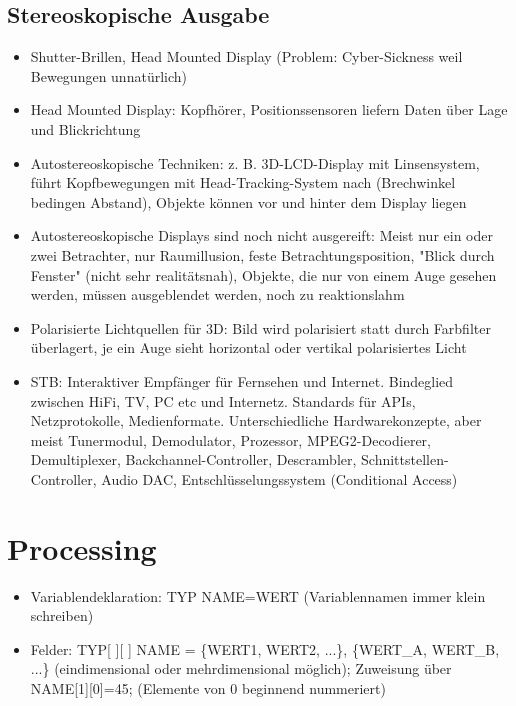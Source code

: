 \documentclass[12pt,landscape]{article}
\begin{document}
\begin{multicols}{3}
\subsection{Stereoskopische Ausgabe}
\begin{itemize}
\item Shutter-Brillen, Head Mounted Display (Problem: Cyber-Sickness weil Bewegungen unnatürlich)
\item Head Mounted Display: Kopfhörer, Positionssensoren liefern Daten über Lage und Blickrichtung
\item Autostereoskopische Techniken: z. B. 3D-LCD-Display mit Linsensystem, führt Kopfbewegungen mit Head-Tracking-System nach (Brechwinkel bedingen Abstand), Objekte können vor und hinter dem Display liegen
\item Autostereoskopische Displays sind noch nicht ausgereift: Meist nur ein oder zwei Betrachter, nur Raumillusion, feste Betrachtungsposition, "Blick durch Fenster" (nicht sehr realitätsnah), Objekte, die nur von einem Auge gesehen werden, müssen ausgeblendet werden, noch zu reaktionslahm
\item Polarisierte Lichtquellen für 3D: Bild wird polarisiert statt durch Farbfilter überlagert, je ein Auge sieht horizontal oder vertikal polarisiertes Licht
\item STB: Interaktiver Empfänger für Fernsehen und Internet. Bindeglied zwischen HiFi, TV, PC etc und Internetz. Standards für APIs, Netzprotokolle, Medienformate. Unterschiedliche Hardwarekonzepte, aber meist Tunermodul, Demodulator, Prozessor, MPEG2-Decodierer, Demultiplexer, Backchannel-Controller, Descrambler, Schnittstellen-Controller, Audio DAC, Entschlüsselungssystem (Conditional Access)
\end{itemize}


\section{Processing}
\begin{itemize}
\item Variablendeklaration: TYP NAME=WERT (Variablennamen immer klein schreiben)
\item Felder: TYP[ ][ ] NAME = \{WERT1, WERT2, ...\}, \{WERT\_A, WERT\_B, ...\} (eindimensional oder mehrdimensional möglich); Zuweisung über NAME[1][0]=45; (Elemente von 0 beginnend nummeriert)

\end{itemize}
\end{multicols}
\end{document}
